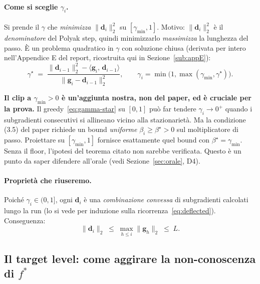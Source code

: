 \documentclass[11pt,a4paper]{article}
\theoremstyle{definition}
\newcommand{\g}{\bm{g}}
\newcommand{\dvec}{\bm{d}}
\newcommand{\fstar}{f^{*}}
\newcommand{\gmin}{\gamma_{\min}}
\newcommand{\inner}[2]{\langle #1,\, #2\rangle}
\newcommand{\norm}[1]{\lVert #1\rVert}
\begin{document}
\paragraph{Come si sceglie $\gamma_i$.} Si prende il $\gamma$ che \emph{minimizza}
$\norm{\dvec_i}_2^2$ su $[\gmin,1]$. Motivo: $\norm{\dvec_i}_2^2$ è il \emph{denominatore} del
Polyak step, quindi minimizzarlo \emph{massimizza} la lunghezza del passo. È un problema
quadratico in $\gamma$ con soluzione chiusa (derivata per intero nell'Appendice E del report,
ricostruita qui in Sezione~\ref{sub:appE}):
\begin{equation}\label{eq:gamma-star}
\gamma^\star \;=\; \frac{\norm{\dvec_{i-1}}_2^2 - \inner{\g_i}{\dvec_{i-1}}}{\norm{\g_i-\dvec_{i-1}}_2^2},
\qquad \gamma_i=\min\!\big(1,\max(\gmin,\gamma^\star)\big).
\end{equation}

\begin{warnbox}
\textbf{Il clip a $\gmin>0$ è un'aggiunta nostra, non del paper, ed è cruciale per la prova.}
Il greedy~\eqref{eq:gamma-star} su $[0,1]$ può far tendere $\gamma_i\to0^+$ quando i
subgradienti consecutivi si allineano vicino alla stazionarietà. Ma la condizione (3.5) del
paper richiede un bound \emph{uniforme} $\beta_i\ge\beta^\star>0$ sul moltiplicatore di passo.
Proiettare su $[\gmin,1]$ fornisce esattamente quel bound con $\beta^\star=\gmin$. Senza il
floor, l'ipotesi del teorema citato non sarebbe verificata. Questo è un punto da saper
difendere all'orale (vedi Sezione~\ref{sec:orale}, D4).
\end{warnbox}

\paragraph{Proprietà che riuseremo.} Poiché $\gamma_i\in(0,1]$, ogni $\dvec_i$ è una
\emph{combinazione convessa} di subgradienti calcolati lungo la run (lo si vede per induzione
sulla ricorrenza~\eqref{eq:deflected}). Conseguenza:
\begin{equation}\label{eq:d-bound}
\norm{\dvec_i}_2 \;\le\; \max_{h\le i}\norm{\g_h}_2 \;\le\; L .
\end{equation}

\subsection{Il target level: come aggirare la non-conoscenza di $\fstar$}
\label{sub:target}
\end{document}
